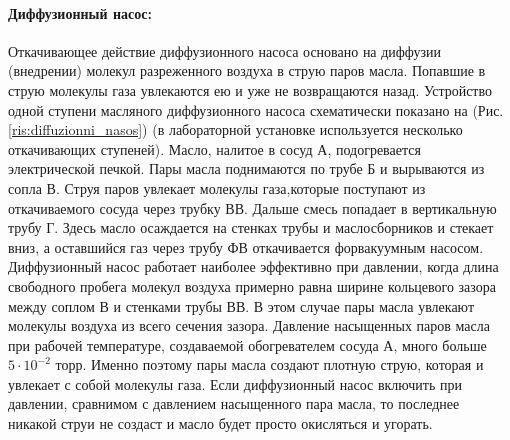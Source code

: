 \documentclass[a4paper,12pt]{article}
\begin{document}

    \paragraph{Диффузионный насос:}
    Откачивающее действие диффузионного насоса основано на диффузии (внедрении) молекул разреженного воздуха в струю паров масла. Попавшие в струю молекулы газа увлекаются ею и уже не возвращаются назад. Устройство одной ступени масляного диффузионного насоса схематически показано на (Рис. \ref{ris:diffuzionni_nasos}) (в лабораторной установке используется несколько откачивающих ступеней). Масло, налитое в сосуд А, подогревается электрической печкой. Пары масла поднимаются по трубе Б и вырываются из сопла В. Струя паров увлекает молекулы газа,которые поступают из откачиваемого сосуда через трубку ВВ. Дальше смесь попадает в вертикальную трубу Г. Здесь масло осаждается на стенках трубы и маслосборников и стекает вниз, а оставшийся газ через трубу ФВ откачивается форвакуумным насосом. Диффузионный насос работает наиболее эффективно при давлении, когда длина свободного пробега молекул воздуха примерно равна ширине кольцевого зазора между соплом В и стенками трубы ВВ. В этом случае пары масла увлекают молекулы воздуха из всего сечения зазора. Давление насыщенных паров масла при рабочей температуре, создаваемой обогревателем сосуда А, много больше $5\cdot10^{-2}$ торр. Именно поэтому пары масла создают плотную струю, которая и увлекает с собой молекулы газа. Если диффузионный насос включить при давлении, сравнимом с давлением насыщенного пара масла, то последнее никакой струи не создаст и масло будет просто окисляться и угорать.
\end{document}
